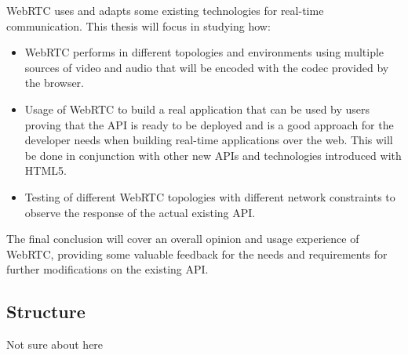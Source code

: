 WebRTC uses and adapts some existing technologies for real-time communication. This thesis will focus in studying how:

\begin{itemize}
	\item WebRTC performs in different topologies and environments using multiple sources of video and audio that will be encoded with the codec provided by the browser.
	
	\item Usage of WebRTC to build a real application that can be used by users proving that the API is ready to be deployed and is a good approach for the developer needs when building real-time applications over the web. This will be done in conjunction with other new APIs and technologies introduced with HTML5.
	
	\item Testing of different WebRTC topologies with different network constraints to observe the response of the actual existing API.
\end{itemize}

The final conclusion will cover an overall opinion and usage experience of WebRTC, providing some valuable feedback for the needs and requirements for further modifications on the existing API.

\subsection{Structure}

Not sure about here